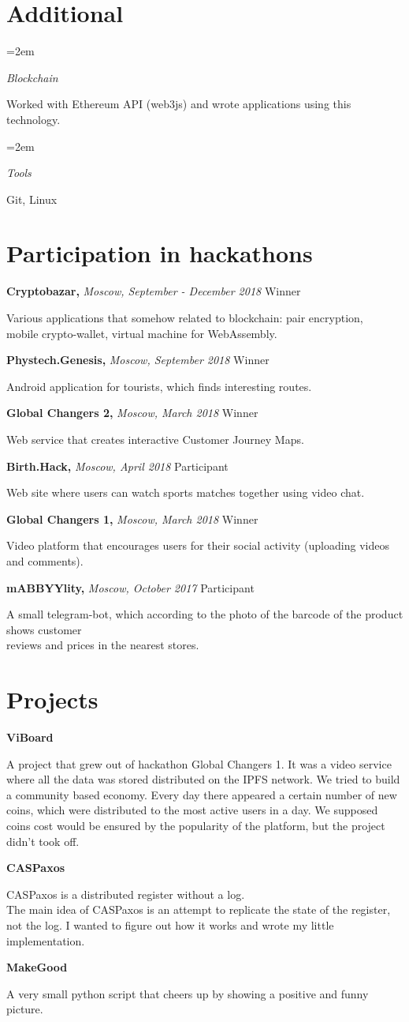 \documentclass[fontsize=11pt]{article}
\newlength{\spacebox}
\newcommand{\sepspace}{\vspace*{1em}}   %
\newcommand{\NewPart}[1]{\section*{#1}}
\newcommand{\PersonalEntry}[2]{
    \noindent\hangindent=2em\hangafter=0 %
    \parbox{\spacebox}{                  %
    \textit{#1}}                      %
    \hspace{1.5em} #2 \par}              %
\newcommand{\SkillsEntry}[2]{                %
    \noindent\hangindent=2em\hangafter=0 %
    \parbox{\spacebox}{                  %
    \textit{#1}}                    %
    \hspace{1.5em} #2 \par}              %
\newcommand{\ProgrammingEntry}[2]{
    \noindent \textbf{#1} \hfill      %

    \noindent \small #2 %
    \normalsize \par}
\newcommand{\EducationEntry}[4]{
    \noindent \textbf{#1} \hfill      %
    \colorbox{Black}{
      \parbox{10em}{
      \color{White} \centering #2}} \par   %
    \noindent \textit{#3} \par        %
    \noindent\hangindent=2em\hangafter=0 \small #4 %
    \normalsize \par}
\newcommand{\AwardEntry}[4]{         %
    \noindent \textbf{#1} \noindent \textit{#3} \hfill {#2} \par
    \noindent \small #4 %
    \normalsize \par}
\begin{document}
\NewPart{Additional}{}
\SkillsEntry{Blockchain}{Worked with Ethereum API (web3js) and wrote applications using this technology.}
\SkillsEntry{Tools}{Git, Linux}

\NewPart{Participation in hackathons}{}

\AwardEntry{Cryptobazar, }{Winner}
{Moscow, September - December 2018}
{Various applications that somehow related to blockchain: pair encryption, \\ mobile crypto-wallet, virtual machine for WebAssembly.}
\sepspace
\AwardEntry{Phystech.Genesis,}{Winner}
{Moscow, September 2018}
{Android application for tourists, which finds interesting routes.}
\sepspace
\AwardEntry{Global Changers 2,}{Winner}
{Moscow, March 2018}
{Web service that creates interactive Customer Journey Maps.}
\sepspace
\AwardEntry{Birth.Hack,}{Participant}
{Moscow, April 2018}
{Web site where users can watch sports matches together using video chat.}
\sepspace
\AwardEntry{Global Changers 1,}{Winner}
{Moscow, March 2018}
{Video platform that encourages users for their social activity (uploading videos and comments).}
\sepspace
\AwardEntry{mABBYYlity,}{Participant}
{Moscow, October 2017}
{A small telegram-bot, which according to the photo of the barcode of the product shows customer\\ reviews and prices in the nearest stores.}

\NewPart{Projects}{}
\ProgrammingEntry
{ViBoard}
{A project that grew out of hackathon Global Changers 1. It was a video service where all the data was stored distributed on the IPFS network. We tried to build a community based economy. Every day there appeared a certain number of new coins, which were distributed to the most active users in a day. We supposed coins cost would be ensured by the popularity of the platform, but the project didn't took off.}
\bigskip
\ProgrammingEntry
{CASPaxos}
{CASPaxos is a distributed register without a log. \\ The main idea of CASPaxos is an attempt to replicate the state of the register, not the log. I wanted to figure out how it works and wrote my little implementation.}
\bigskip
\ProgrammingEntry
{MakeGood}
{A very small python script that cheers up by showing a positive and funny picture.}
\end{document}

